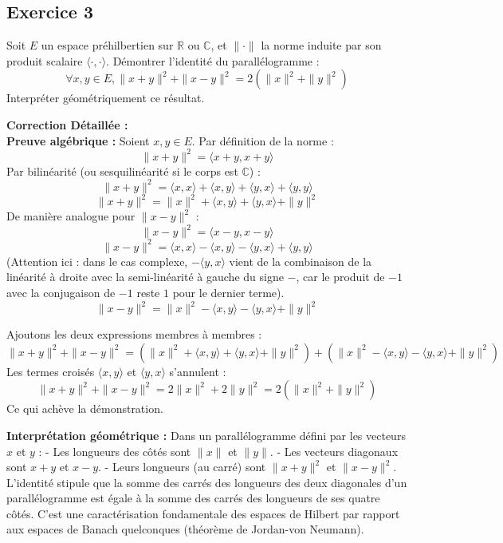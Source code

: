 \documentclass[11pt,a4paper]{report}
\begin{document}
\subsection*{Exercice 3}

Soit $E$ un espace préhilbertien sur $\mathbb{R}$ ou $\mathbb{C}$, et $\| \cdot \|$ la norme induite par son produit scalaire $\langle \cdot, \cdot \rangle$.
Démontrer l'identité du parallélogramme :
$$\forall x, y \in E, \|x + y\|^2 + \|x - y\|^2 = 2(\|x\|^2 + \|y\|^2)$$
Interpréter géométriquement ce résultat.

\textbf{Correction Détaillée :}\\ \textbf{Preuve algébrique :}
Soient $x, y \in E$. Par définition de la norme :
$$\|x + y\|^2 = \langle x + y, x + y \rangle$$
Par bilinéarité (ou sesquilinéarité si le corps est $\mathbb{C}$) :
$$\|x + y\|^2 = \langle x, x \rangle + \langle x, y \rangle + \langle y, x \rangle + \langle y, y \rangle$$
$$\|x + y\|^2 = \|x\|^2 + \langle x, y \rangle + \langle y, x \rangle + \|y\|^2$$
De manière analogue pour $\|x - y\|^2$ :
$$\|x - y\|^2 = \langle x - y, x - y \rangle$$
$$\|x - y\|^2 = \langle x, x \rangle - \langle x, y \rangle - \langle y, x \rangle + \langle y, y \rangle$$
(Attention ici : dans le cas complexe, $-\langle y, x \rangle$ vient de la combinaison de la linéarité à droite avec la semi-linéarité à gauche du signe $-$, car le produit de $-1$ avec la conjugaison de $-1$ reste $1$ pour le dernier terme).
$$\|x - y\|^2 = \|x\|^2 - \langle x, y \rangle - \langle y, x \rangle + \|y\|^2$$

Ajoutons les deux expressions membres à membres :
$$\|x + y\|^2 + \|x - y\|^2 = (\|x\|^2 + \langle x, y \rangle + \langle y, x \rangle + \|y\|^2) + (\|x\|^2 - \langle x, y \rangle - \langle y, x \rangle + \|y\|^2)$$
Les termes croisés $\langle x, y \rangle$ et $\langle y, x \rangle$ s'annulent :
$$\|x + y\|^2 + \|x - y\|^2 = 2\|x\|^2 + 2\|y\|^2 = 2(\|x\|^2 + \|y\|^2)$$
Ce qui achève la démonstration.

\textbf{Interprétation géométrique :}
Dans un parallélogramme défini par les vecteurs $x$ et $y$ :
- Les longueurs des côtés sont $\|x\|$ et $\|y\|$.
- Les vecteurs diagonaux sont $x+y$ et $x-y$.
- Leurs longueurs (au carré) sont $\|x+y\|^2$ et $\|x-y\|^2$.
L'identité stipule que la somme des carrés des longueurs des deux diagonales d'un parallélogramme est égale à la somme des carrés des longueurs de ses quatre côtés. C'est une caractérisation fondamentale des espaces de Hilbert par rapport aux espaces de Banach quelconques (théorème de Jordan-von Neumann).
\end{document}
